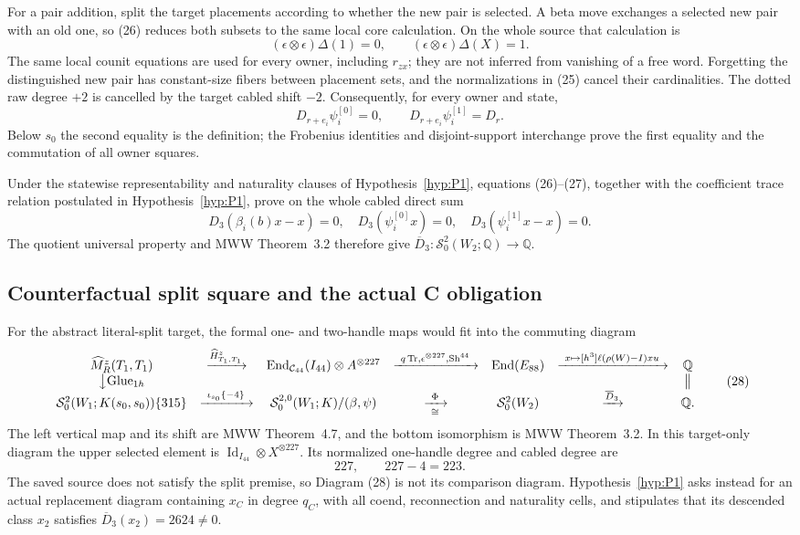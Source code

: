 \documentclass[11pt]{amsart}
\theoremstyle{definition}
\theoremstyle{remark}
\newcommand{\Q}{\mathbb{Q}}
\begin{document}
For a pair addition, split the target placements according to whether the
new pair is selected.  A beta move exchanges a selected new pair with an old
one, so (26) reduces both subsets to the same local core calculation.  On the
whole source that calculation is
\[
(\epsilon\otimes\epsilon)\Delta(1)=0,\qquad
(\epsilon\otimes\epsilon)\Delta(X)=1.
\]
The same local counit equations are used for every owner, including
$r_{zx}$; they are not inferred from vanishing of a free word.  Forgetting the distinguished new pair has constant-size fibers
between placement sets, and the normalizations in (25) cancel their
cardinalities.  The dotted raw degree $+2$ is cancelled by the target cabled
shift $-2$.  Consequently, for every owner and state,
\[
D_{r+e_i}\psi_i^{[0]}=0,\qquad
D_{r+e_i}\psi_i^{[1]}=D_r.
\tag{27}
\]
Below $s_0$ the second equality is the definition; the Frobenius identities
and disjoint-support interchange prove the first equality and the commutation
of all owner squares.

Under the statewise representability and naturality clauses of
Hypothesis~\ref{hyp:P1}, equations (26)--(27), together with the coefficient
trace relation postulated in Hypothesis~\ref{hyp:P1}, prove on the whole cabled direct sum
\[
D_3(\beta_i(b)x-x)=0,\quad
D_3(\psi_i^{[0]}x)=0,\quad
D_3(\psi_i^{[1]}x-x)=0.
\]
The quotient universal property and MWW Theorem~3.2 therefore give
$\overline D_3:\mathcal S^2_0(W_2;\Q)\to\Q$.

\subsection{Counterfactual split square and the actual C obligation}

For the abstract literal-split target, the formal one- and two-handle maps
would fit into the commuting diagram
\[
\begin{array}{ccccccc}
\widehat M_R^z(T_1,T_1)&\xrightarrow{\widehat H^z_{T_1,T_1}}&
\operatorname{End}_{\mathcal C_{44}}(I_{44})\otimes A^{\otimes227}
&\xrightarrow{\ q\operatorname{Tr},\epsilon^{\otimes227},\operatorname{Sh}^{44}\ }&
\operatorname{End}(E_{88})&\xrightarrow{\ x\mapsto[h^3]\ell(\rho(W)-I)xu\ }&\Q\\
\big\downarrow{\mathrm{Glue}_{1h}}&&&&&&\big\Vert\\
\mathcal S^2_0(W_1;K(s_0,s_0))\{315\}
&\xrightarrow{\ \iota_{s_0}\{-4\}\ }&
\mathcal S^{2,0}_0(W_1;K)/(\beta,\psi)
&\xrightarrow[\cong]{\ \Phi\ }&\mathcal S^2_0(W_2)
&\xrightarrow{\overline D_3}&\Q.
\end{array}
\tag{28}
\]
The left vertical map and its shift are MWW Theorem~4.7, and the bottom
isomorphism is MWW Theorem~3.2.  In this target-only diagram the upper selected element is
$\operatorname{Id}_{I_{44}}\otimes X^{\otimes227}$.  Its normalized
one-handle degree and cabled degree are
\[
227,\qquad227-4=223.
\]
The saved source does not satisfy the split premise, so Diagram (28) is not
its comparison diagram.  Hypothesis~\ref{hyp:P1} asks instead for an actual
replacement diagram containing $x_C$ in degree $q_C$, with all coend,
reconnection and naturality cells, and stipulates that its descended class
$x_2$ satisfies $\overline D_3(x_2)=2624\ne0$.
\end{document}
